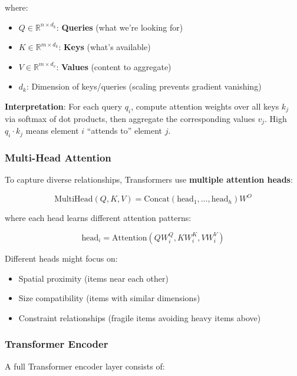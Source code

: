 where:
\begin{itemize}
\item $Q \in \mathbb{R}^{n \times d_k}$: \textbf{Queries} (what we're looking for)
\item $K \in \mathbb{R}^{m \times d_k}$: \textbf{Keys} (what's available)
\item $V \in \mathbb{R}^{m \times d_v}$: \textbf{Values} (content to aggregate)
\item $d_k$: Dimension of keys/queries (scaling prevents gradient vanishing)
\end{itemize}

\textbf{Interpretation}: For each query $q_i$, compute attention weights over all keys $k_j$ via softmax of dot products, then aggregate the corresponding values $v_j$. High $q_i \cdot k_j$ means element $i$ ``attends to'' element $j$.

\subsubsection{Multi-Head Attention}

To capture diverse relationships, Transformers use \textbf{multiple attention heads}:

\begin{equation}
\text{MultiHead}(Q, K, V) = \text{Concat}(\text{head}_1, \ldots, \text{head}_h) W^O
\end{equation}

where each head learns different attention patterns:

\begin{equation}
\text{head}_i = \text{Attention}(QW_i^Q, KW_i^K, VW_i^V)
\end{equation}

Different heads might focus on:
\begin{itemize}
\item Spatial proximity (items near each other)
\item Size compatibility (items with similar dimensions)
\item Constraint relationships (fragile items avoiding heavy items above)
\end{itemize}

\subsubsection{Transformer Encoder}

A full Transformer encoder layer consists of:

